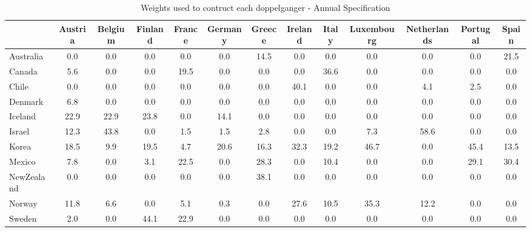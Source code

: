 \begin{table}[htbp]
\caption{\label{clabel} Weights used to contruct each doppelganger - Annual Specification}\centering\medskip
\begin{tabular}{lcccccccccccc} \hline \hline
 & Austria  & Belgium  & Finland  & France  & Germany  & Greece  & Ireland  & Italy  & Luxembourg  & Netherlands  & Portugal  & Spain  \\  \hline 
Australia &       0.0 &       0.0 &       0.0 &       0.0 &       0.0 &      14.5 &       0.0 &       0.0 &       0.0 &       0.0 &       0.0 &      21.5 \\  
Canada &       5.6 &       0.0 &       0.0 &      19.5 &       0.0 &       0.0 &       0.0 &      36.6 &       0.0 &       0.0 &       0.0 &       0.0 \\  
Chile &       0.0 &       0.0 &       0.0 &       0.0 &       0.0 &       0.0 &      40.1 &       0.0 &       0.0 &       4.1 &       2.5 &       0.0 \\  
Denmark &       6.8 &       0.0 &       0.0 &       0.0 &       0.0 &       0.0 &       0.0 &       0.0 &       0.0 &       0.0 &       0.0 &       0.0 \\  
Iceland &      22.9 &      22.9 &      23.8 &       0.0 &      14.1 &       0.0 &       0.0 &       0.0 &       0.0 &       0.0 &       0.0 &       0.0 \\  
Israel &      12.3 &      43.8 &       0.0 &       1.5 &       1.5 &       2.8 &       0.0 &       0.0 &       7.3 &      58.6 &       0.0 &       0.0 \\  
Korea &      18.5 &       9.9 &      19.5 &       4.7 &      20.6 &      16.3 &      32.3 &      19.2 &      46.7 &       0.0 &      45.4 &      13.5 \\  
Mexico &       7.8 &       0.0 &       3.1 &      22.5 &       0.0 &      28.3 &       0.0 &      10.4 &       0.0 &       0.0 &      29.1 &      30.4 \\  
NewZealand &       0.0 &       0.0 &       0.0 &       0.0 &       0.0 &      38.1 &       0.0 &       0.0 &       0.0 &       0.0 &       0.0 &       0.0 \\  
Norway &      11.8 &       6.6 &       0.0 &       5.1 &       0.3 &       0.0 &      27.6 &      10.5 &      35.3 &      12.2 &       0.0 &       0.0 \\  
Sweden &       2.0 &       0.0 &      44.1 &      22.9 &       0.0 &       0.0 &       0.0 &       0.0 &       0.0 &       0.0 &       0.0 &       0.0 \\  

\end{tabular}
\end{table}
